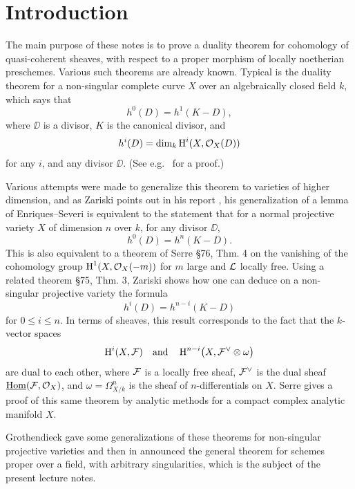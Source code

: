 \chapter{Introduction}
\bigskip
The main purpose of these notes is to prove a duality theorem for cohomology of quasi-coherent sheaves, with respect to a proper morphism of locally noetherian preschemes. Various such theorems are already known. Typical is the duality theorem for a non-singular complete curve $X$ over an algebraically closed field $k$, which says that
\[
h^{0}(D)=h^{1}(K-D),
\]
where $\DD$ is a divisor, $K$ is the canonical divisor, and
\[
h^{i}(D)=\dim_{k} \operatorname{H}^{i}(X, \mathcal{O}_{X}(D))
\]
for any $i$, and any divisor $\DD$. (See e.g.~\cite{16, Ch. II} for a proof.)

Various attempts were made to generalize this theorem to varieties of higher dimension, and as Zariski points out in his report \cite{20}, his generalization of a lemma of Enriques--Severi \cite{19} is equivalent to the statement that for a normal projective variety $X$ of dimension $n$ over $k$, for any divisor $\DD$,
\[
h^{0}(D)=h^{n}(K-D).
\]
This is also equivalent to a theorem of Serre \cite{FAC} \S 76, Thm. 4
on the vanishing of the cohomology group $\operatorname{H}^{1}(X, \mathcal{O}_{X}(-m))$ for $m$ large and $\mathcal{L}$ locally free. Using a related theorem \cite{FAC} \S 75, Thm. 3, Zariski shows how one can deduce on a non-singular projective variety the formula
\[
h^{i}(D)=h^{n-i}(K-D)
\]
for $0\leq i\leq n$. In terms of sheaves, this result corresponds to the fact that the $k$-vector spaces
\[
\operatorname{H}^{i}(X, \mathcal{F}) \quad\text{and}\quad \operatorname{H}^{n-i}\bigl(X, \mathcal{F}^{\vee}\otimes\omega\bigr)
\]
are dual to each other, where $\mathcal{F}$ is a locally free sheaf, $\mathcal{F}^{\vee}$ is the dual sheaf $\underline{\operatorname{Hom}}(\mathcal{F},\mathcal{O}_{X})$,
 and $\omega=\Omega_{X/k}^{n}$ is the sheaf of $n$-differentials on $X$. Serre \cite{15} gives a proof of this same theorem by analytic methods for a compact complex analytic manifold $X$.

Grothendieck \cite{8} gave some generalizations of these theorems for non-singular projective varieties and then in \cite{9} announced the general theorem for schemes proper over a field, with arbitrary singularities, which is the subject of the present lecture notes.


